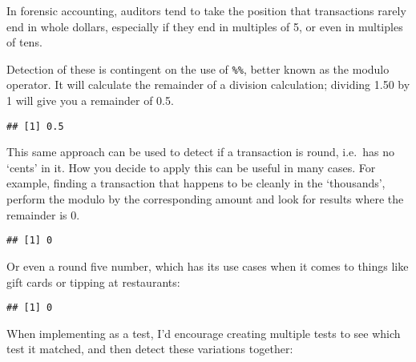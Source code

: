 \documentclass[
]{book}
\newenvironment{Shaded}{\begin{snugshade}}{\end{snugshade}}
\newcommand{\DecValTok}[1]{\textcolor[rgb]{0.00,0.00,0.81}{#1}}
\newcommand{\FloatTok}[1]{\textcolor[rgb]{0.00,0.00,0.81}{#1}}
\newcommand{\OperatorTok}[1]{\textcolor[rgb]{0.81,0.36,0.00}{\textbf{#1}}}
\newcommand{\StringTok}[1]{\textcolor[rgb]{0.31,0.60,0.02}{#1}}
\begin{document}
In forensic accounting, auditors tend to take the position that transactions rarely end in whole dollars, especially if they end in multiples of 5, or even in multiples of tens.

Detection of these is contingent on the use of \texttt{\%\%}, better known as the modulo operator. It will calculate the remainder of a division calculation; dividing 1.50 by 1 will give you a remainder of 0.5.

\begin{Shaded}
\end{Shaded}

\begin{verbatim}
## [1] 0.5
\end{verbatim}

This same approach can be used to detect if a transaction is round, i.e.~has no `cents' in it. How you decide to apply this can be useful in many cases. For example, finding a transaction that happens to be cleanly in the `thousands', perform the modulo by the corresponding amount and look for results where the remainder is 0.

\begin{Shaded}
\end{Shaded}

\begin{verbatim}
## [1] 0
\end{verbatim}

Or even a round five number, which has its use cases when it comes to things like gift cards or tipping at restaurants:

\begin{Shaded}
\end{Shaded}

\begin{verbatim}
## [1] 0
\end{verbatim}

When implementing as a test, I'd encourage creating multiple tests to see which test it matched, and then detect these variations together:
\end{document}
